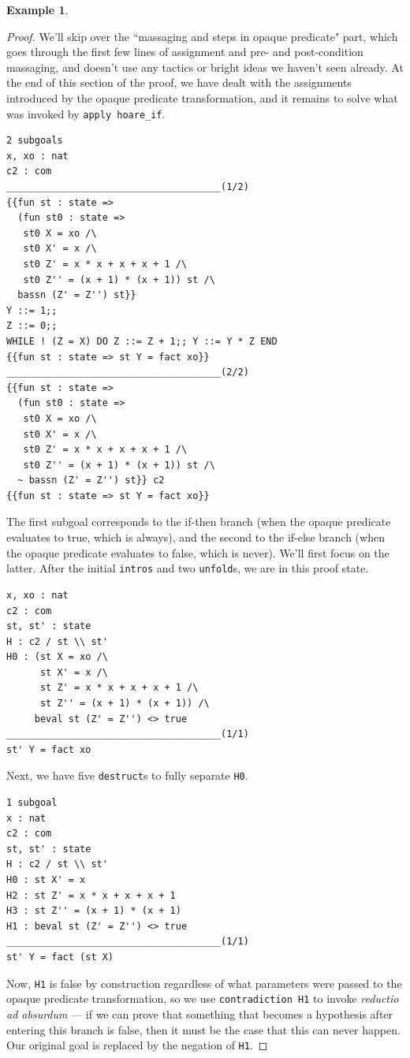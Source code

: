 \documentclass[12pt,notitlepage]{report}
\theoremstyle{plain}
\theoremstyle{definition}
\newtheorem{example}[theo]{Example}
\newcommand{\define}[1]{\emph{#1}\index{#1}}
\numberwithin{equation}{section}
\begin{document}
\begin{example}
\begin{proof}
We'll skip over the ``massaging and steps in opaque predicate" part, which goes through the first few lines of assignment and pre- and post-condition massaging, and doesn't use any tactics or bright ideas we haven't seen already.  At the end of this section of the proof, we have dealt with the assignments introduced by the opaque predicate transformation, and it remains to solve what was invoked by \verb$apply hoare_if$.
\begin{verbatim}
2 subgoals
x, xo : nat
c2 : com
______________________________________(1/2)
{{fun st : state =>
  (fun st0 : state =>
   st0 X = xo /\
   st0 X' = x /\
   st0 Z' = x * x + x + x + 1 /\
   st0 Z'' = (x + 1) * (x + 1)) st /\
  bassn (Z' = Z'') st}}
Y ::= 1;;
Z ::= 0;;
WHILE ! (Z = X) DO Z ::= Z + 1;; Y ::= Y * Z END
{{fun st : state => st Y = fact xo}}
______________________________________(2/2)
{{fun st : state =>
  (fun st0 : state =>
   st0 X = xo /\
   st0 X' = x /\
   st0 Z' = x * x + x + x + 1 /\
   st0 Z'' = (x + 1) * (x + 1)) st /\
  ~ bassn (Z' = Z'') st}} c2
{{fun st : state => st Y = fact xo}}
\end{verbatim}
The first subgoal corresponds to the if-then branch (when the opaque predicate evaluates to true, which is always), and the second to the if-else branch (when the opaque predicate evaluates to false, which is never).  We'll first focus on the latter.  After the initial \verb$intros$ and two \verb$unfold$s, we are in this proof state.
\begin{verbatim}
x, xo : nat
c2 : com
st, st' : state
H : c2 / st \\ st'
H0 : (st X = xo /\
      st X' = x /\
      st Z' = x * x + x + x + 1 /\
      st Z'' = (x + 1) * (x + 1)) /\
     beval st (Z' = Z'') <> true
______________________________________(1/1)
st' Y = fact xo
\end{verbatim}
Next, we have five \verb$destruct$s to fully separate \verb$H0$.
\begin{verbatim}
1 subgoal
x : nat
c2 : com
st, st' : state
H : c2 / st \\ st'
H0 : st X' = x
H2 : st Z' = x * x + x + x + 1
H3 : st Z'' = (x + 1) * (x + 1)
H1 : beval st (Z' = Z'') <> true
______________________________________(1/1)
st' Y = fact (st X)
\end{verbatim}
Now, \verb$H1$ is false by construction regardless of what parameters were passed to the opaque predicate transformation, so we use \verb$contradiction H1$ to invoke \define{reductio ad absurdum} --- if we can prove that something that becomes a hypothesis after entering this branch is false, then it must be the case that this can never happen.  Our original goal is replaced by the negation of \verb$H1$.

\end{proof}
\end{example}
\end{document}
